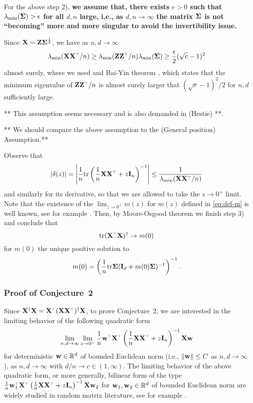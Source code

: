 \documentclass[11pt]{article}
\begin{document}
For the above step 2), \textbf{we assume that, there exists $\epsilon > 0$ such that $\lambda_{\min}( \mathbf{\Sigma}) > \epsilon$ for all $d,n$ large, i.e., as $d,n \to \infty$ the matrix $\mathbf{\Sigma}$ is not ``becoming'' more and more singular to avoid the invertibility issue.}

Since $\mathbf X = \mathbf Z \mathbf{\Sigma}^{\frac12}$, we have as $n, d \to \infty$
\[
  \lambda_{\min} (\X \X^\top/n) \ge \lambda_{\min} (\Z \Z^\top/n) \lambda_{\min} (\Sigmab) \ge \frac{\epsilon}2 (\sqrt c - 1 )^2
\]
almost surely, where we used and Bai-Yin theorem \cite{bai1993limit}, which states that the minimum eigenvalue of $\Z \Z^\top/n$ is almost surely larger that $( \sqrt c - 1 )^2/2$ for $n,d$ sufficiently large.

** This assumption seems necessary and is also demanded in (Hestie) **.

** We should compare the above assumption to the (General position) Assumption.**

Observe that
\[
  |\delta(z)| = \left| \frac1n \tr \left( \frac1n \X \X^\top  + z \I_n \right)^{-1} \right| \le \frac1{ \lambda_{\min} (\X \X^\top/n) }
\]
and similarly for its derivative, so that we are allowed to take the $z \to 0^+$ limit. Note that the existence of the $\lim_{z \to 0^+} m(z)$ for $m(z)$ defined in \eqref{eq:def-m} is well known, see for example \cite{ledoit2011eigenvectors}. Then, by Moore-Osgood theorem we finish step 3) and conclude that
\[
  \tr (\X^\top \X)^\dagger \to m(0)
\]
for $m(0)$ the unique positive solution to
\[
  m(0) = \left( \frac1n \mathrm{tr} \mathbf{\Sigma} (\mathbf I_d + m(0) \mathbf{\Sigma})^{-1} \right)^{-1}.
\]

\subsubsection{Proof of Conjecture~2}

Since $\X^\dagger \X = \X^\top (\X \X^\top)^\dagger \X$, to prove Conjecture~2, we are interested in the limiting behavior of the following quadratic form 
\[
  \lim_{n,d \to \infty} \lim_{z \to 0^+} \frac1n \w^\top \X^\top \left( \frac1n \X \X^\top + z \I_n \right)^{-1} \X \w
\]
for deterministic $\mathbf w \in \mathbb R^{d}$ of bounded Euclidean norm (i.e., $\| \mathbf w \| \le C$ as $n,d \to \infty$), as $n,d \to \infty$ with $d/n \to c \in (1,\infty)$. The limiting behavior of the above quadratic form, or more generally, bilinear form of the type $\frac1n \w_1^\top \X^\top \left( \frac1n \X \X^\top + z \I_n \right)^{-1} \X \w_2$ for $\mathbf w_1, \mathbf w_2 \in \mathbb R^{d}$ of bounded Euclidean norm are widely studied in random matrix literature, see for example \cite{hachem2013bilinear}.
\end{document}
